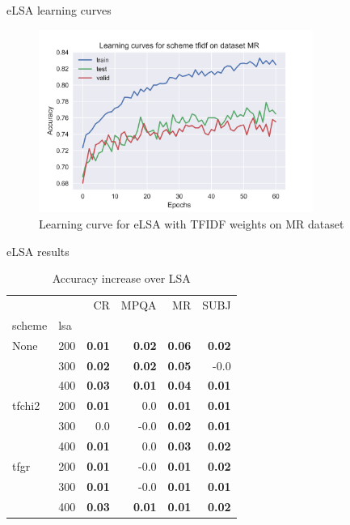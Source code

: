 \documentclass[xcolor={table}]{beamer}
\begin{document}
\begin{frame}{eLSA learning curves}
    \begin{figure}
    \centerline{\includegraphics[width=0.8\textwidth]{learning_curve_MR_tfidf}}
    \caption[Learning curve for eLSA with tfidf weights on MR dataset]{Learning curve for eLSA with TFIDF weights on MR dataset}
    \label{img:learning:curve}
    \end{figure}
\end{frame} 

\begin{frame}{eLSA results}
    \small
\begin{table}[H]
\begin{center}

\begin{tabular}{ll|rrrr}
\toprule
   &   &   CR &  MPQA &   MR &  SUBJ \\
scheme & lsa &        &        &        &        \\
\midrule
None & 200 & \textbf{0.01} & \textbf{0.02} & \textbf{0.06} & \textbf{0.02} \\
   & 300 & \textbf{0.02} & \textbf{0.02} & \textbf{0.05} &     -0.0 \\
   & 400 & \textbf{0.03} & \textbf{0.01} & \textbf{0.04} & \textbf{0.01} \\
tfchi2 & 200 & \textbf{0.01} &      0.0 & \textbf{0.01} & \textbf{0.01} \\
   & 300 &      0.0 &     -0.0 & \textbf{0.02} & \textbf{0.01} \\
   & 400 & \textbf{0.01} &      0.0 & \textbf{0.03} & \textbf{0.02} \\
tfgr & 200 & \textbf{0.01} &     -0.0 & \textbf{0.01} & \textbf{0.02} \\
   & 300 & \textbf{0.01} &     -0.0 & \textbf{0.01} & \textbf{0.01} \\
   & 400 & \textbf{0.03} & \textbf{0.01} & \textbf{0.01} & \textbf{0.02} \\
\bottomrule
\end{tabular}

\caption[Accuracy increase over LSA]{Accuracy increase over LSA}
\label{tab:batch:results}
\end{center}
\end{table}
\end{frame}
\end{document}
